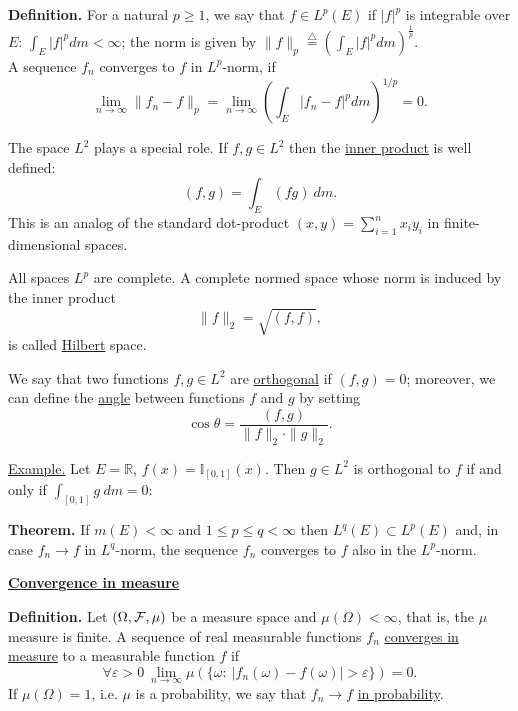 \documentclass[a4paper,10pt]{article}
\def\RR{\mathbb{R}}
\def\II{\mathbb{I}}
\newcommand{\1}[1]{\mathbf{1}_{\{#1\}}}
\newcommand{\defi}{\stackrel{\triangle}{=}}
\begin{document}
{\bf Definition.} For a natural $p\ge 1$, we say that $f\in L^p(E)$ if $|f|^p$ is integrable over $E$: $\displaystyle \int_E |f|^pdm<\infty$; the norm is given by $\displaystyle \|f\|_p\defi\left(\int_E |f|^p dm\right)^{\frac{1}{p}}$.\\
A sequence $f_n$ converges to $f$ in $L^p$-norm, if
  $$\lim_{n\to\infty} \|f_n-f\|_p=\lim_{n\to\infty} \left(\int_E |f_n-f|^pdm\right)^{1/p}=0.$$\vspace{3mm}

The space $L^2$ plays a special role. If $f,g\in L^2$ then the \underline{inner product} is well defined:
  $$(f,g)=\int_E(fg)~dm.$$
This is an analog of the standard dot-product $(x,y)=\sum_{i=1}^n x_iy_i$ in finite-dimensional spaces. \vspace{3mm}

All spaces $L^p$ are complete. A complete normed space whose norm is induced by the inner product
  $$\|f\|_2=\sqrt{(f,f)},$$
is called \underline{Hilbert} space. \vspace{3mm}

We say that two functions $f,g\in L^2$ are \underline{orthogonal} if $(f,g)=0$; moreover, we can define the \underline{angle} between  functions $f$ and $g$ by setting
  $$\cos\theta=\frac{(f,g)}{\|f\|_2\cdot \|g\|_2}.$$\vspace{3mm}

\underline{Example.} Let $E=\RR$, $f(x)=\II_{[0,1]}(x)$. Then $g\in L^2$ is orthogonal to $f$ if and only if $\int_{[0,1]} g~dm=0$: \vspace{5cm}

{\bf Theorem.} If $m(E)<\infty$ and $1\le p\le q<\infty$ then $L^q(E)\subset L^p(E)$ and, in case $f_n\to f$ in $L^q$-norm, the sequence $f_n$ converges to $f$ also in the $L^p$-norm.
\vspace{3mm}

\begin{center}\bf\underline{Convergence in measure} \end{center}\vspace{3mm}

{\bf Definition.} Let $(\Omega,{\cal F},\mu)$ be a measure space and $\mu(\Omega)<\infty$, that is, the $\mu$ measure is finite. A sequence of real measurable functions $f_n$ \underline{converges in measure} to a measurable function $f$ if
  $$\forall\varepsilon>0~\lim_{n\to\infty} \mu(\{\omega:~|f_n(\omega)-f(\omega)|>\varepsilon\})=0.$$
If $\mu(\Omega)=1$, i.e. $\mu$ is a probability, we say that $f_n\to f$ \underline{in probability}.\vspace{3mm}
\end{document}
